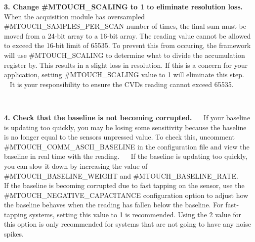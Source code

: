 \begin{DoxyItemize}
\item {\bfseries 3. Change \#\+M\+T\+O\+U\+C\+H\+\_\+\+S\+C\+A\+L\+I\+N\+G to 1 to eliminate resolution loss.}~\newline
~\newline
 When the acquisition module has oversampled \#\+M\+T\+O\+U\+C\+H\+\_\+\+S\+A\+M\+P\+L\+E\+S\+\_\+\+P\+E\+R\+\_\+\+S\+C\+A\+N number of times, the final sum must be moved from a 24-\/bit array to a 16-\/bit array. The reading value cannot be allowed to exceed the 16-\/bit limit of 65535. To prevent this from occuring, the framework will use \#\+M\+T\+O\+U\+C\+H\+\_\+\+S\+C\+A\+L\+I\+N\+G to determine what to divide the accumulation register by. This results in a slight loss in resolution. If this is a concern for your application, setting \#\+M\+T\+O\+U\+C\+H\+\_\+\+S\+C\+A\+L\+I\+N\+G value to 1 will eliminate this step.~\newline
 ~\newline
 It is your responsibility to ensure the C\+V\+D\textquotesingle{}s reading cannot exceed 65535.\end{DoxyItemize}
~\newline


\begin{DoxyItemize}
\item {\bfseries 4. Check that the baseline is not becoming corrupted.}~\newline
~\newline
 If your baseline is updating too quickly, you may be losing some sensitivity because the baseline is no longer equal to the sensor\textquotesingle{}s unpressed value. To check this, uncomment \#\+M\+T\+O\+U\+C\+H\+\_\+\+C\+O\+M\+M\+\_\+\+A\+S\+C\+I\+I\+\_\+\+B\+A\+S\+E\+L\+I\+N\+E in the configuration file and view the baseline in real time with the reading.~\newline
 ~\newline
 If the baseline is updating too quickly, you can slow it down by increasing the value of \#\+M\+T\+O\+U\+C\+H\+\_\+\+B\+A\+S\+E\+L\+I\+N\+E\+\_\+\+W\+E\+I\+G\+H\+T and \#\+M\+T\+O\+U\+C\+H\+\_\+\+B\+A\+S\+E\+L\+I\+N\+E\+\_\+\+R\+A\+T\+E.~\newline
 ~\newline
 If the baseline is becoming corrupted due to fast tapping on the sensor, use the \#\+M\+T\+O\+U\+C\+H\+\_\+\+N\+E\+G\+A\+T\+I\+V\+E\+\_\+\+C\+A\+P\+A\+C\+I\+T\+A\+N\+C\+E configuration option to adjust how the baseline behaves when the reading has fallen below the baseline. For fast-\/tapping systems, setting this value to 1 is recommended. Using the \textquotesingle{}2\textquotesingle{} value for this option is only recommended for systems that are not going to have any noise spikes.\end{DoxyItemize}
~\newline


